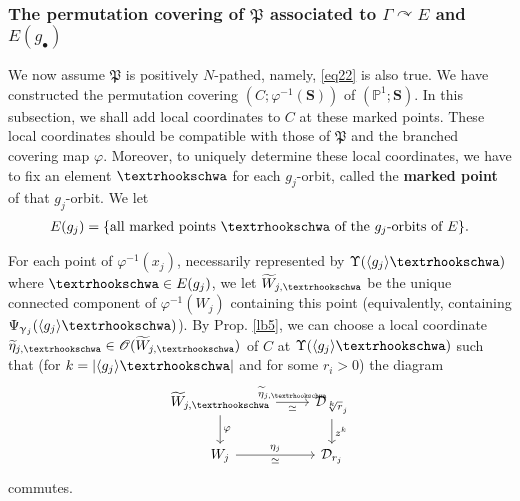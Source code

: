 \documentclass[12pt,a4paper,notitlepage]{article}
\theoremstyle{definition}
\theoremstyle{plain}
\newcommand{\fk}{\mathfrak}
\newcommand{\mc}{\mathcal}
\newcommand{\wtd}{\widetilde}
\newcommand{\bk}[1]{\langle {#1}\rangle}
\newcommand{\scr}{\mathscr}
\newcommand{\blt}{\bullet}
\newcommand{\Pbb}{\mathbb P}
\newcommand{\Sbf}{\mathbf{S}}
\newcommand{\tipae}{\text{\textrhookschwa}}
\numberwithin{equation}{subsection}
\begin{document}
\subsubsection{The permutation covering of $\fk P$ associated to $\Gamma\curvearrowright E$ and $E(g_\blt)$}\label{lb31}

We now assume $\fk P$ is positively $N$-pathed, namely, \eqref{eq22} is also true. We have constructed the permutation covering $(C;\varphi^{-1}(\Sbf))$ of $(\Pbb^1;\Sbf)$. In this subsection, we shall add local coordinates to $C$ at these marked points. These local coordinates should be compatible with those of $\fk P$ and the branched covering map $\varphi$. Moreover, to uniquely determine these local coordinates, we have to fix an element $\tipae$ for each $g_j$-orbit, called the \textbf{marked point} of that $g_j$-orbit. We let 
\begin{align*}
E(g_j)=\{\text{all marked points $\tipae$ of the $g_j$-orbits of $E$}\}.	
\end{align*}




For each point of $\varphi^{-1}(x_j)$, necessarily represented by $\Upsilon(\bk{g_j}\tipae)$ where $\tipae\in E(g_j)$, we let $\wtd W_{j,\tipae}$ be the unique connected component of $\varphi^{-1}(W_j)$ containing this point (equivalently, containing $\Psi_{\upgamma_j}(\bk{g_j}\tipae)$). By Prop. \ref{lb5}, we can choose a local coordinate $\wtd\eta_{j,\tipae}\in\scr O(\wtd W_{j,\tipae})$ of $C$ at $\Upsilon(\bk{g_j}\tipae)$ such that (for $k=|\bk{g_j}\tipae|$ and for some $r_i>0$) the diagram \index{Wg@$\wtd W_{j,\tipae}$} \index{zz@$\wtd\eta_{j,\tipae}$}
\begin{equation}\label{eq25}
	\begin{tikzcd}
		\wtd W_{j,\tipae} \arrow[r, "\wtd\eta_{j,\tipae}","\simeq"'] \arrow[d, "\varphi"]
		& \mc D_{\sqrt[k]r_j} \arrow[d, "z^k"] \\
		W_j \arrow[r,  "\eta_j","\simeq"']
		&  \mc D_{r_j}
	\end{tikzcd}	
\end{equation}
commutes. 
\end{document}
